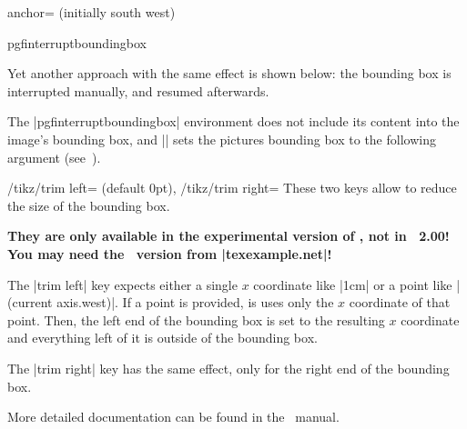 \begin{pgfplotskey}{anchor= (initially south west)}
\begin{minipage}
\begin{tabular}
\begin{center}
\begin{environment}{{pgfinterruptboundingbox}}
\label{sec:bounding:box:example}%
{%
%
	Yet another approach with the same effect is shown below: the bounding box is interrupted manually, and resumed afterwards.
\begin{codeexample}[]
\setlength{\fboxsep}{0pt}%
%
\end{codeexample}%
}%
The |pgfinterruptboundingbox| environment does not include its content into the image's bounding box, and |\useasboundingbox| sets the pictures bounding box to the following argument (see~\cite{tikz}).
\end{environment}

\begin{keylist}{%
	/tikz/trim left= (default 0pt),
	/tikz/trim right=}
	These two keys allow to reduce the size of the bounding box.

	{\bfseries They are only available in the experimental version of \PGF, not in \PGF\ 2.00! You may need the \PGF\ version from |texexample.net|!}

	The |trim left| key expects either a single $x$ coordinate like |1cm| or a point like |(current axis.west)|. If a point is provided, is uses only the $x$ coordinate of that point. Then, the left end of the bounding box is set to the resulting $x$ coordinate and everything left of it is outside of the bounding box.

	The |trim right| key has the same effect, only for the right end of the bounding box.


	More detailed documentation can be found in the \Tikz\ manual.
\end{keylist}


\end{center}
\end{tabular}
\end{minipage}
\end{pgfplotskey}
